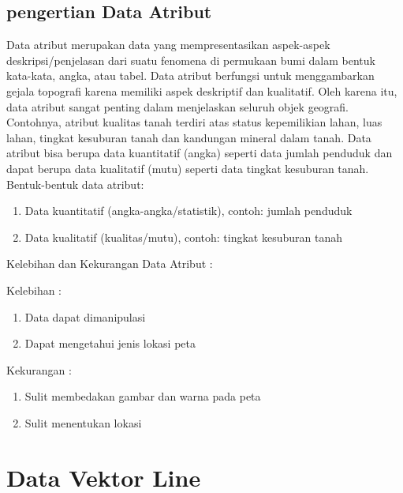 \subsection{pengertian Data Atribut}
Data atribut merupakan data yang mempresentasikan aspek-aspek deskripsi/penjelasan 
dari suatu fenomena di permukaan bumi dalam bentuk kata-kata, angka, atau tabel. 
Data atribut berfungsi untuk menggambarkan gejala topografi karena memiliki aspek deskriptif dan kualitatif. 
Oleh karena itu, data atribut sangat penting dalam menjelaskan seluruh objek geografi. 
Contohnya, atribut kualitas tanah terdiri atas status kepemilikian lahan, luas lahan, 
tingkat kesuburan tanah dan kandungan mineral dalam tanah. 
Data atribut bisa berupa data kuantitatif (angka) seperti data jumlah penduduk dan dapat berupa data kualitatif (mutu) 
seperti data tingkat kesuburan tanah.  
Bentuk-bentuk data atribut:
\begin{enumerate}
\item	Data kuantitatif (angka-angka/statistik), contoh: jumlah penduduk
\item	Data kualitatif (kualitas/mutu), contoh: tingkat kesuburan tanah
\end{enumerate}

Kelebihan dan Kekurangan Data Atribut :

Kelebihan :
\begin{enumerate}
   \item Data dapat dimanipulasi 
   \item Dapat mengetahui jenis lokasi peta
\end{enumerate}
Kekurangan :
\begin{enumerate}
   \item Sulit membedakan gambar dan warna pada peta
   \item Sulit menentukan lokasi
\end{enumerate}

\section{Data Vektor Line}
